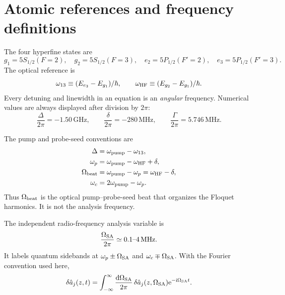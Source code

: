 \documentclass[11pt,a4paper]{article}
\newcommand{\dd}{\mathrm d}
\newcommand{\ii}{\mathrm i}
\newcommand{\e}{\mathrm e}
\newcommand{\GHz}{\,\mathrm{GHz}}
\newcommand{\MHz}{\,\mathrm{MHz}}
\begin{document}
\section{Atomic references and frequency definitions}

The four hyperfine states are
\[
g_1=5S_{1/2}(F=2),\quad g_2=5S_{1/2}(F=3),\quad
e_2=5P_{1/2}(F'=2),\quad e_3=5P_{1/2}(F'=3).
\]
The optical reference is
\[
\omega_{13}\equiv(E_{e_3}-E_{g_1})/\hbar,\qquad
\omega_{\rm HF}\equiv(E_{g_2}-E_{g_1})/\hbar .
\]
Every detuning and linewidth in an equation is an \emph{angular} frequency.
Numerical values are always displayed after division by $2\pi$:
\[
\frac{\Delta}{2\pi}=-1.50\GHz,\qquad
\frac{\delta}{2\pi}=-280\MHz,\qquad
\frac{\Gamma}{2\pi}=5.746\MHz .
\]

The pump and probe-seed conventions are
\begin{align}
\Delta&=\omega_{\rm pump}-\omega_{13},\\
\omega_p&=\omega_{\rm pump}-\omega_{\rm HF}+\delta,\\
\Omega_{\rm beat}&=\omega_{\rm pump}-\omega_p=\omega_{\rm HF}-\delta,\\
\omega_c&=2\omega_{\rm pump}-\omega_p .
\label{eq:frequency-definitions}
\end{align}
Thus $\Omega_{\rm beat}$ is the optical pump--probe-seed beat that organizes the
Floquet harmonics. It is not the analysis frequency.

The independent radio-frequency analysis variable is
\[
\frac{\Omega_{\rm SA}}{2\pi}\simeq0.1\text{--}4\MHz .
\]
It labels quantum sidebands at $\omega_p\pm\Omega_{\rm SA}$ and
$\omega_c\mp\Omega_{\rm SA}$. With the Fourier convention used here,
\begin{equation}
\delta\hat a_j(z,t)=
\int_{-\infty}^{\infty}\frac{\dd\Omega_{\rm SA}}{2\pi}\,
\delta\hat a_j(z,\Omega_{\rm SA})\e^{-\ii\Omega_{\rm SA}t}.
\label{eq:fourier}
\end{equation}
\end{document}
